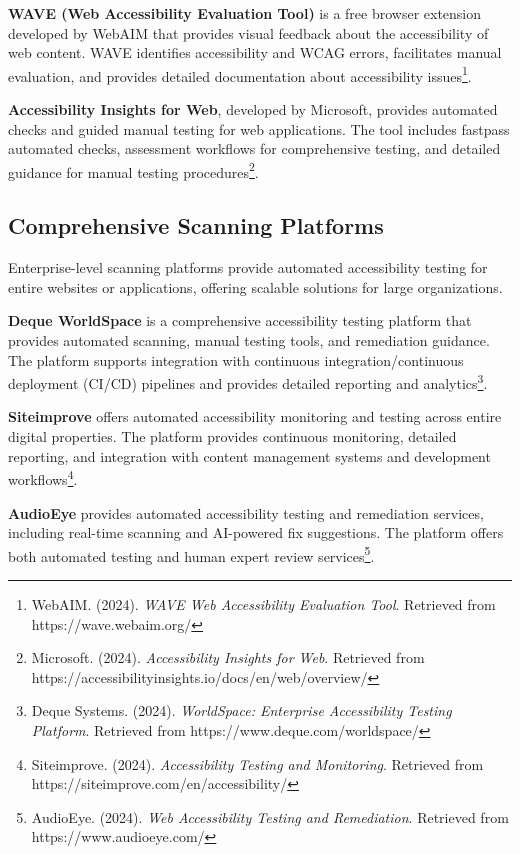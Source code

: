 \textbf{WAVE (Web Accessibility Evaluation Tool)} is a free browser extension developed by WebAIM that provides visual feedback about the accessibility of web content. WAVE identifies accessibility and WCAG errors, facilitates manual evaluation, and provides detailed documentation about accessibility issues\footnote{WebAIM. (2024). \textit{WAVE Web Accessibility Evaluation Tool}. Retrieved from https://wave.webaim.org/}.

\textbf{Accessibility Insights for Web}, developed by Microsoft, provides automated checks and guided manual testing for web applications. The tool includes fastpass automated checks, assessment workflows for comprehensive testing, and detailed guidance for manual testing procedures\footnote{Microsoft. (2024). \textit{Accessibility Insights for Web}. Retrieved from https://accessibilityinsights.io/docs/en/web/overview/}.

\subsection{Comprehensive Scanning Platforms}

Enterprise-level scanning platforms provide automated accessibility testing for entire websites or applications, offering scalable solutions for large organizations.

\textbf{Deque WorldSpace} is a comprehensive accessibility testing platform that provides automated scanning, manual testing tools, and remediation guidance. The platform supports integration with continuous integration/continuous deployment (CI/CD) pipelines and provides detailed reporting and analytics\footnote{Deque Systems. (2024). \textit{WorldSpace: Enterprise Accessibility Testing Platform}. Retrieved from https://www.deque.com/worldspace/}.

\textbf{Siteimprove} offers automated accessibility monitoring and testing across entire digital properties. The platform provides continuous monitoring, detailed reporting, and integration with content management systems and development workflows\footnote{Siteimprove. (2024). \textit{Accessibility Testing and Monitoring}. Retrieved from https://siteimprove.com/en/accessibility/}.

\textbf{AudioEye} provides automated accessibility testing and remediation services, including real-time scanning and AI-powered fix suggestions. The platform offers both automated testing and human expert review services\footnote{AudioEye. (2024). \textit{Web Accessibility Testing and Remediation}. Retrieved from https://www.audioeye.com/}.

